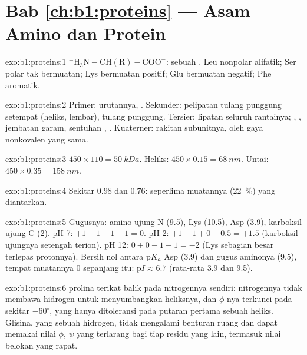 \section*{Bab \ref{ch:b1:proteins} --- Asam Amino dan Protein}

\begin{solution}{exo:b1:proteins:1}
$\mathrm{^+H_3N{-}CH(R){-}COO^-}$: sebuah . Leu nonpolar
alifatik; Ser polar tak bermuatan; Lys bermuatan positif; Glu bermuatan
negatif; Phe aromatik.
\end{solution}

\begin{solution}{exo:b1:proteins:2}
Primer: urutannya, . Sekunder: pelipatan tulang punggung
setempat (heliks, lembar),  tulang punggung. Tersier:
lipatan seluruh rantainya; , , jembatan
garam, sentuhan , . Kuaterner: rakitan
subunitnya, oleh gaya nonkovalen yang sama.
\end{solution}

\begin{solution}{exo:b1:proteins:3}
$450\times 110 = \qty{50}{kDa}$. Heliks: $450\times 0.15 = \qty{68}{nm}$.
Untai: $450\times 0.35 = \qty{158}{nm}$.
\end{solution}

\begin{solution}{exo:b1:proteins:4}
Sekitar $0.98$ dan $0.76$: seperlima muatannya (\qty{22}{\%}) yang
diantarkan.
\end{solution}

\begin{solution}{exo:b1:proteins:5}
Gugusnya: amino ujung N (9.5),  Lys (10.5),  Asp (3.9), karboksil ujung C (2). pH 7: $+1 + 1 - 1 - 1 = 0$.
pH 2: $+1 + 1 + 0 - 0.5 = +1.5$ (karboksil ujungnya setengah terion).
pH 12: $0 + 0 - 1 - 1 = -2$ (Lys sebagian besar terlepas protonnya).
Bersih nol antara p$K_a$ Asp (3.9) dan gugus aminonya (9.5), tempat
muatannya $0$ sepanjang itu: p$I \approx 6.7$ (rata-rata 3.9 dan 9.5).
\end{solution}

\begin{solution}{exo:b1:proteins:6}
 prolina terikat balik pada nitrogennya sendiri:
nitrogennya tidak membawa hidrogen untuk menyumbangkan 
heliksnya, dan $\phi$-nya terkunci pada sekitar $-60^\circ$, yang hanya
ditoleransi pada putaran pertama sebuah heliks. Glisina, yang  sebuah hidrogen, tidak mengalami benturan ruang dan dapat
memakai nilai $\phi$, $\psi$ yang terlarang bagi tiap residu yang lain,
termasuk nilai belokan yang rapat.
\end{solution}

